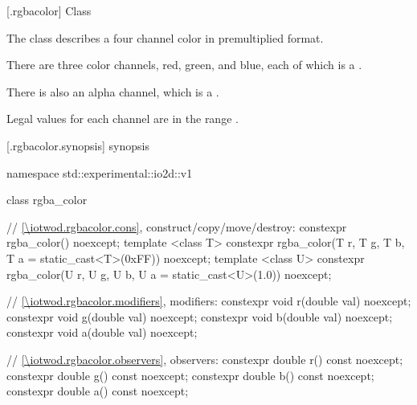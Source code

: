  [\iotwod.rgbacolor] {Class }

\pnum
{}%
The class  describes a four channel color in premultiplied format.

\pnum
There are three color channels, red, green, and blue, each of which is a .

\pnum
There is also an alpha channel, which is a .

\pnum
Legal values for each channel are in the range .

%
 [\iotwod.rgbacolor.synopsis] { synopsis}

\begin{codeblock}
namespace std::experimental::io2d::v1 {
  class rgba_color {
    // \ref{\iotwod.rgbacolor.cons}, construct/copy/move/destroy:
    constexpr rgba_color() noexcept;
    template <class T>
    constexpr rgba_color(T r, T g, T b, T a = static_cast<T>(0xFF)) noexcept;
    template <class U>
    constexpr rgba_color(U r, U g, U b, U a = static_cast<U>(1.0)) noexcept;
  
    // \ref{\iotwod.rgbacolor.modifiers}, modifiers:
    constexpr void r(double val) noexcept;
    constexpr void g(double val) noexcept;
    constexpr void b(double val) noexcept;
    constexpr void a(double val) noexcept;
    
    // \ref{\iotwod.rgbacolor.observers}, observers:
    constexpr double r() const noexcept;
    constexpr double g() const noexcept;
    constexpr double b() const noexcept;
    constexpr double a() const noexcept;
    
}}
\end{codeblock}
